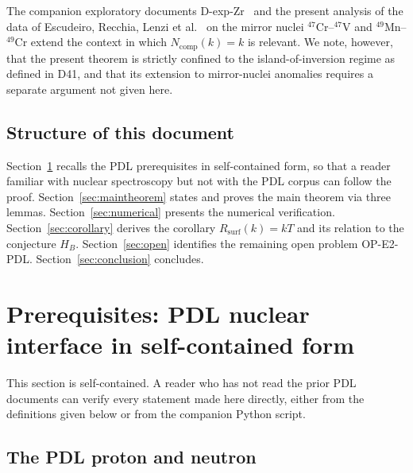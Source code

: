 \documentclass[11pt,a4paper]{article}
\theoremstyle{definition}
\theoremstyle{remark}
\newcommand{\Rsurf}{R_{\mathrm{surf}}}
\newcommand{\Tpdl}{T}
\newcommand{\Ncomp}{N_{\mathrm{comp}}}
\begin{document}
The companion exploratory documents D-exp-Zr~\cite{PDL_Dexp_Zr} and the present analysis of the data of Escudeiro, Recchia, Lenzi et al.~\cite{Escudeiro_2026} on the mirror nuclei $^{47}$Cr--$^{47}$V and $^{49}$Mn--$^{49}$Cr extend the context in which $\Ncomp(k) = k$ is relevant. We note, however, that the present theorem is strictly confined to the island-of-inversion regime as defined in D41, and that its extension to mirror-nuclei anomalies requires a separate argument not given here.

\subsection{Structure of this document}

Section~\ref{sec:prerequisites} recalls the PDL prerequisites in self-contained form, so that a reader familiar with nuclear spectroscopy but not with the PDL corpus can follow the proof. Section~\ref{sec:maintheorem} states and proves the main theorem via three lemmas. Section~\ref{sec:numerical} presents the numerical verification. Section~\ref{sec:corollary} derives the corollary $\Rsurf(k) = k\Tpdl$ and its relation to the conjecture $H_B$. Section~\ref{sec:open} identifies the remaining open problem OP-E2-PDL. Section~\ref{sec:conclusion} concludes.

\section{Prerequisites: PDL nuclear interface in self-contained form}
\label{sec:prerequisites}

This section is self-contained. A reader who has not read the prior PDL documents can verify every statement made here directly, either from the definitions given below or from the companion Python script.

\subsection{The PDL proton and neutron}
\end{document}
